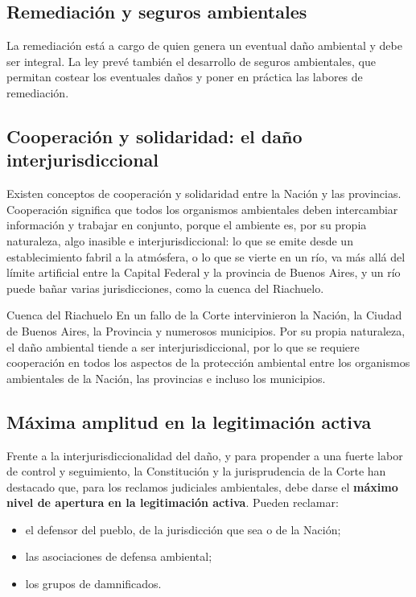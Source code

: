 \documentclass[12pt,oneside]{book}
\begin{document}
\subsection{Remediación y seguros ambientales}

La remediación está a cargo de quien genera un eventual daño ambiental y debe ser integral. La ley prevé también el desarrollo de seguros ambientales, que permitan costear los eventuales daños y poner en práctica las labores de remediación.

\subsection{Cooperación y solidaridad: el daño interjurisdiccional}

Existen conceptos de cooperación y solidaridad entre la Nación y las provincias. Cooperación significa que todos los organismos ambientales deben intercambiar información y trabajar en conjunto, porque el ambiente es, por su propia naturaleza, algo inasible e interjurisdiccional: lo que se emite desde un establecimiento fabril a la atmósfera, o lo que se vierte en un río, va más allá del límite artificial entre la Capital Federal y la provincia de Buenos Aires, y un río puede bañar varias jurisdicciones, como la cuenca del Riachuelo.

\begin{example}{Cuenca del Riachuelo}
En un fallo de la Corte intervinieron la Nación, la Ciudad de Buenos Aires, la Provincia y numerosos municipios. Por su propia naturaleza, el daño ambiental tiende a ser interjurisdiccional, por lo que se requiere cooperación en todos los aspectos de la protección ambiental entre los organismos ambientales de la Nación, las provincias e incluso los municipios.
\end{example}

\subsection{Máxima amplitud en la legitimación activa}

Frente a la interjurisdiccionalidad del daño, y para propender a una fuerte labor de control y seguimiento, la Constitución y la jurisprudencia de la Corte han destacado que, para los reclamos judiciales ambientales, debe darse el \textbf{máximo nivel de apertura en la legitimación activa}. Pueden reclamar:
\begin{itemize}
    \item el defensor del pueblo, de la jurisdicción que sea o de la Nación;
    \item las asociaciones de defensa ambiental;
    \item los grupos de damnificados.
\end{itemize}
\end{document}
